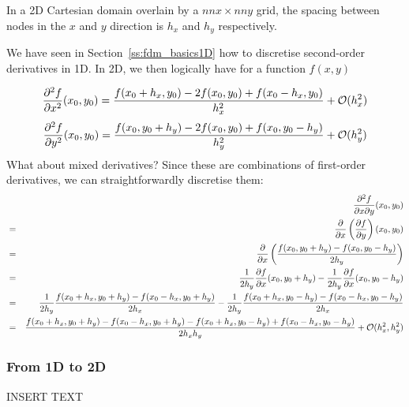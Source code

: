 
In a 2D Cartesian domain overlain by a $nnx \times nny$ grid, 
the spacing between nodes in the $x$ and $y$ direction is $h_x$ 
and $h_y$ respectively. 

\begin{center}

\end{center}

We have seen in Section~\ref{ss:fdm_basics1D} how to discretise second-order derivatives in 1D. 
In 2D, we then logically have for a function $f(x,y)$

\begin{equation}
\frac{\partial^2 f}{\partial x^2}(x_0,y_0) = \frac{f(x_0+h_x,y_0) -2f(x_0,y_0) + f(x_0-h_x,y_0) }{h_x^2} 
+ {\cal O}(h_x^2)
\end{equation}
\begin{equation}
\frac{\partial^2 f}{\partial y^2}(x_0,y_0) = \frac{f(x_0,y_0+h_y) -2f(x_0,y_0) + f(x_0,y_0-h_y) }{h_y^2} 
+ {\cal O}(h_y^2)
\end{equation}
What about mixed derivatives? Since these are combinations of first-order derivatives, 
we can straightforwardly discretise them:
\begin{eqnarray}
&& \frac{\partial^2 f }{\partial x \partial y}(x_0,y_0) \nonumber\\
&=& \frac{\partial }{\partial x} \left(\frac{\partial f}{\partial y}\right) (x_0,y_0) \nonumber\\
&=& \frac{\partial }{\partial x} \left(\frac{ f(x_0,y_0+h_y)-f(x_0,y_0-h_y)}{2h_y} \right) \nonumber\\
&=& \frac{1}{2h_y} \frac{\partial f}{\partial x} (x_0,y_0+h_y)
   -\frac{1}{2h_y} \frac{\partial f}{\partial x} (x_0,y_0-h_y) \nonumber\\
&=& \frac{1}{2h_y}  \frac{ f(x_0+h_x,y_0+h_y)-f(x_0-h_x,y_0+h_y)}{2h_x} 
-   \frac{1}{2h_y}  \frac{ f(x_0+h_x,y_0-h_y)-f(x_0-h_x,y_0-h_y)}{2h_x}  \nonumber\\
&=& \frac{f(x_0+h_x,y_0+h_y)-f(x_0-h_x,y_0+h_y)-f(x_0+h_x,y_0-h_y)+f(x_0-h_x,y_0-h_y)}{2 h_x h_y}
+ {\cal O}(h_x^2,h_y^2) \nonumber
\end{eqnarray}

\subsubsection{From 1D to 2D}

INSERT TEXT

\begin{center}

\end{center}


